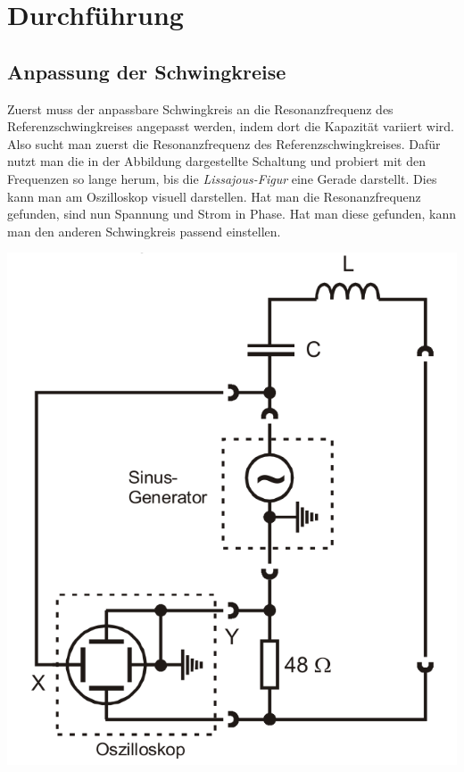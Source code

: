 \section{Durchführung}
\label{sec:Durchführung}


\subsection{Anpassung der Schwingkreise}
\begin{minipage}{0.5\textwidth}
    Zuerst muss der anpassbare Schwingkreis an die Resonanzfrequenz des Referenzschwingkreises angepasst werden, indem dort die Kapazität variiert wird.
    Also sucht man zuerst die Resonanzfrequenz des Referenzschwingkreises.
    Dafür nutzt man die in der Abbildung dargestellte Schaltung und probiert mit den Frequenzen so lange herum,
    bis die \textit{Lissajous-Figur} eine Gerade darstellt. Dies kann man am  Oszilloskop visuell darstellen.
    Hat man die Resonanzfrequenz gefunden, sind nun Spannung und Strom in Phase.
    Hat man diese gefunden, kann man den anderen Schwingkreis passend einstellen.
\end{minipage}
\begin{minipage}{0.5\textwidth}
    \includegraphics[width=\textwidth]{pictures/messschaltung.png}
\end{minipage}

